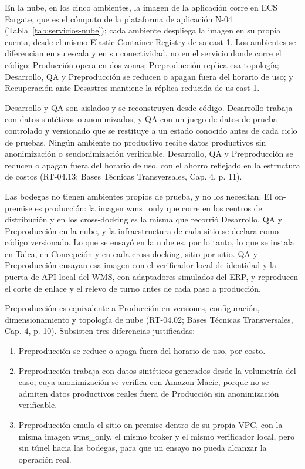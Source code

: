 En la nube, en los cinco ambientes, la imagen de la aplicación corre en ECS Fargate, que es el cómputo de la plataforma de aplicación N-04 (Tabla~\ref{tab:servicios-nube}); cada ambiente despliega la imagen en su propia cuenta, desde el mismo Elastic Container Registry de sa-east-1. Los ambientes se diferencian en su escala y en su conectividad, no en el servicio donde corre el código: Producción opera en dos zonas; Preproducción replica esa topología; Desarrollo, QA y Preproducción se reducen o apagan fuera del horario de uso; y Recuperación ante Desastres mantiene la réplica reducida de us-east-1.

Desarrollo y QA son aislados y se reconstruyen desde código. Desarrollo trabaja con datos sintéticos o anonimizados, y QA con un juego de datos de prueba controlado y versionado que se restituye a un estado conocido antes de cada ciclo de pruebas. Ningún ambiente no productivo recibe datos productivos sin anonimización o seudonimización verificable. Desarrollo, QA y Preproducción se reducen o apagan fuera del horario de uso, con el ahorro reflejado en la estructura de costos (RT-04.13; Bases Técnicas Transversales, Cap. 4, p. 11).

Las bodegas no tienen ambientes propios de prueba, y no los necesitan. El on-premise es producción: la imagen wms\_only que corre en los centros de distribución y en los cross-docking es la misma que recorrió Desarrollo, QA y Preproducción en la nube, y la infraestructura de cada sitio se declara como código versionado. Lo que se ensayó en la nube es, por lo tanto, lo que se instala en Talca, en Concepción y en cada cross-docking, sitio por sitio. QA y Preproducción ensayan esa imagen con el verificador local de identidad y la puerta de API local del WMS, con adaptadores simulados del ERP, y reproducen el corte de enlace y el relevo de turno antes de cada paso a producción.

Preproducción es equivalente a Producción en versiones, configuración, dimensionamiento y topología de nube (RT-04.02; Bases Técnicas Transversales, Cap. 4, p. 10). Subsisten tres diferencias justificadas:

\begin{enumerate}
  \item Preproducción se reduce o apaga fuera del horario de uso, por costo.
  \item Preproducción trabaja con datos sintéticos generados desde la volumetría del caso, cuya anonimización se verifica con Amazon Macie, porque no se admiten datos productivos reales fuera de Producción sin anonimización verificable.
  \item Preproducción emula el sitio on-premise dentro de su propia VPC, con la misma imagen wms\_only, el mismo broker y el mismo verificador local, pero sin túnel hacia las bodegas, para que un ensayo no pueda alcanzar la operación real.
\end{enumerate}

